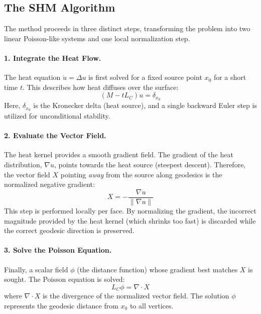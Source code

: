 \documentclass[11pt,a4paper]{article}
\begin{document}
\subsection{The SHM Algorithm}
The method proceeds in three distinct steps, transforming the problem into two linear Poisson-like systems and one local normalization step.

\paragraph{1. Integrate the Heat Flow.}
The heat equation $\dot{u} = \Delta u$ is first solved for a fixed source point $x_0$ for a short time $t$. This describes how heat diffuses over the surface:
\begin{equation}
    (M - t L_C) u = \delta_{x_0}
\end{equation}
Here, $\delta_{x_0}$ is the Kronecker delta (heat source), and a single backward Euler step is utilized for unconditional stability.

\paragraph{2. Evaluate the Vector Field.}
The heat kernel provides a smooth gradient field. The gradient of the heat distribution, $\nabla u$, points towards the heat source (steepest descent). Therefore, the vector field $X$ pointing \textit{away} from the source along geodesics is the normalized negative gradient:
\begin{equation}
    X = - \frac{\nabla u}{\| \nabla u \|}
\end{equation}
This step is performed locally per face. By normalizing the gradient, the incorrect magnitude provided by the heat kernel (which shrinks too fast) is discarded while the correct geodesic direction is preserved.

\paragraph{3. Solve the Poisson Equation.}
Finally, a scalar field $\phi$ (the distance function) whose gradient best matches $X$ is sought. The Poisson equation is solved:
\begin{equation}
    L_C \phi = \nabla \cdot X
\end{equation}
where $\nabla \cdot X$ is the divergence of the normalized vector field. The solution $\phi$ represents the geodesic distance from $x_0$ to all vertices.
\end{document}
